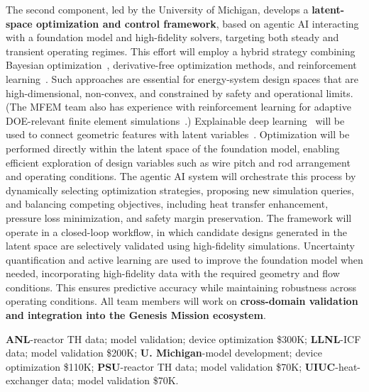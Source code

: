 The second component, led by the University of Michigan, develops a {\bf
latent-space optimization and control framework}, based on agentic AI
interacting with a foundation model and high-fidelity solvers, targeting both
steady and transient operating regimes.  
This effort will employ a hybrid strategy combining 
   {\rm Bayesian optimization}~\cite{Morita2022BOCFD}, 
   {\rm derivative-free optimization methods}, and 
   {\rm reinforcement learning}~\cite{Font2025DRLFlowControl}.  
Such approaches are essential for energy-system design spaces that are
high-dimensional, non-convex, and constrained by safety and operational limits.
(The MFEM team also has experience with reinforcement learning for
adaptive DOE-relevant finite element simulations~\cite{RL23}.)
%
Explainable deep learning~\cite{ricardo24,ricardo25} will be used to connect geometric
features with latent variables~\cite{ricardo26_causality}. 
%
%
Optimization will be performed directly within the latent space of the
foundation model, enabling efficient exploration of design variables such as
wire pitch and rod arrangement and operating conditions. 
The {\rm agentic AI
system} will orchestrate this process by dynamically selecting optimization
strategies, proposing new simulation queries, and balancing competing
objectives, including heat transfer enhancement, pressure loss minimization,
and safety margin preservation.
%
The framework will operate in a closed-loop workflow, in which candidate
designs generated in the latent space are selectively validated using high-fidelity
simulations.  
Uncertainty quantification and active learning are used to improve the
foundation model when needed, incorporating high-fidelity data with the
required geometry and flow conditions.  
  This ensures predictive accuracy while maintaining robustness across operating conditions.
%
All team members will work on {\bf cross-domain validation and integration into the
Genesis Mission ecosystem}.



\vspace*{.1in}
   {\bf ANL}-reactor TH data; model validation; device optimization \$300K;
   {\bf LLNL}-ICF data; model validation \$200K;
   {\bf U. Michigan}-model development; device optimization \$110K;
   {\bf PSU}-reactor TH data; model validation \$70K;
   {\bf UIUC}-heat-exchanger data; model validation \$70K.
